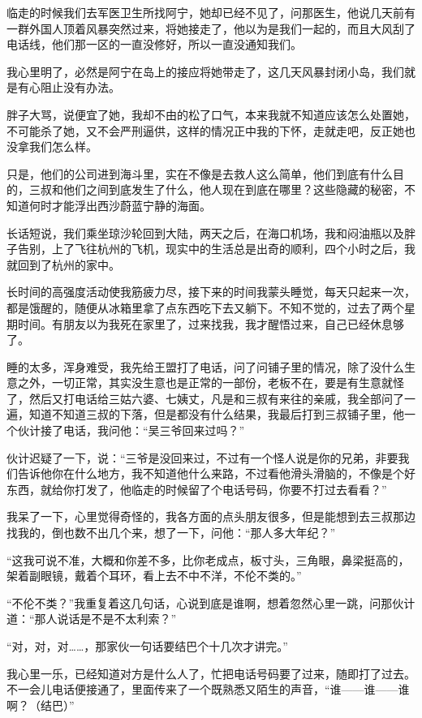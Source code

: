 临走的时候我们去军医卫生所找阿宁，她却已经不见了，问那医生，他说几天前有一群外国人顶着风暴突然过来，将她接走了，他以为是我们一起的，而且大风刮了电话线，他们那一区的一直没修好，所以一直没通知我们。

我心里明了，必然是阿宁在岛上的接应将她带走了，这几天风暴封闭小岛，我们就是有心阻止没有办法。

胖子大骂，说便宜了她，我却不由的松了口气，本来我就不知道应该怎么处置她，不可能杀了她，又不会严刑逼供，这样的情况正中我的下怀，走就走吧，反正她也没拿我们怎么样。

只是，他们的公司进到海斗里，实在不像是去救人这么简单，他们到底有什么目的，三叔和他们之间到底发生了什么，他人现在到底在哪里？这些隐藏的秘密，不知道何时才能浮出西沙蔚蓝宁静的海面。

长话短说，我们乘坐琼沙轮回到大陆，两天之后，在海口机场，我和闷油瓶以及胖子告别，上了飞往杭州的飞机，现实中的生活总是出奇的顺利，四个小时之后，我就回到了杭州的家中。

长时间的高强度活动使我筋疲力尽，接下来的时间我蒙头睡觉，每天只起来一次，都是饿醒的，随便从冰箱里拿了点东西吃下去又躺下。不知不觉的，过去了两个星期时间。有朋友以为我死在家里了，过来找我，我才醒悟过来，自己已经休息够了。

睡的太多，浑身难受，我先给王盟打了电话，问了问铺子里的情况，除了没什么生意之外，一切正常，其实没生意也是正常的一部份，老板不在，要是有生意就怪了，然后又打电话给三姑六婆、七姨丈，凡是和三叔有来往的亲戚，我全部问了一遍，知道不知道三叔的下落，但是都没有什么结果，我最后打到三叔铺子里，他一个伙计接了电话，我问他：“吴三爷回来过吗？”

伙计迟疑了一下，说：“三爷是没回来过，不过有一个怪人说是你的兄弟，非要我们告诉他你在什么地方，我不知道他什么来路，不过看他滑头滑脑的，不像是个好东西，就给你打发了，他临走的时候留了个电话号码，你要不打过去看看？”

我呆了一下，心里觉得奇怪的，我各方面的点头朋友很多，但是能想到去三叔那边找我的，倒也数不出几个来，想了一下，问他：“那人多大年纪？”

“这我可说不准，大概和你差不多，比你老成点，板寸头，三角眼，鼻梁挺高的，架着副眼镜，戴着个耳环，看上去不中不洋，不伦不类的。”

“不伦不类？”我重复着这几句话，心说到底是谁啊，想着忽然心里一跳，问那伙计道：“那人说话是不是不太利索？”

“对，对，对……，那家伙一句话要结巴个十几次才讲完。”

我心里一乐，已经知道对方是什么人了，忙把电话号码要了过来，随即打了过去。不一会儿电话便接通了，里面传来了一个既熟悉又陌生的声音，“谁——谁——谁啊？（结巴）”


